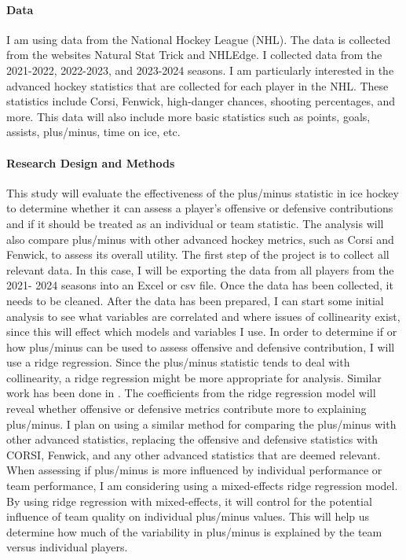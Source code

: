 \documentclass[12pt]{article}
\begin{document}
\paragraph{Data}

I am using data from the National Hockey League (NHL). The data is collected from the websites Natural Stat Trick and NHLEdge. 
I collected data from the 2021-2022, 2022-2023, and 2023-2024 seasons. I am particularly interested in the advanced hockey 
statistics that are collected for each player in the NHL. These statistics include Corsi, Fenwick, high-danger chances,
shooting percentages, and more. This data will also include more basic statistics such as points, goals, assists, plus/minus,
time on ice, etc.



\paragraph{Research Design and Methods}
This study will evaluate the effectiveness of the plus/minus statistic in ice hockey to determine whether it can assess a 
player's offensive or defensive contributions and if it should be treated as an individual or team statistic. The analysis 
will also compare plus/minus with other advanced hockey metrics, such as Corsi and Fenwick, to assess its overall utility.
The first step of the project is to collect all relevant data. In this case, I will be exporting the data from all players
from the 2021- 2024 seasons into an Excel or csv file. Once the data has been collected, it needs to be cleaned. After the
data has been prepared, I can start some initial analysis to see what variables are correlated and where issues of collinearity 
exist, since this will effect which models and variables I use. 
In order to determine if or how plus/minus can be used to assess offensive and defensive contribution, I will use a ridge 
regression. Since the plus/minus statistic tends to deal with collinearity, a ridge regression might be more appropriate for 
analysis. Similar work has been done in \cite{Macdonald_2012}. The coefficients from the ridge regression model will reveal 
whether offensive or defensive metrics contribute more to explaining plus/minus. I plan on using a similar method for comparing
the plus/minus with other advanced statistics, replacing the offensive and defensive statistics with CORSI, Fenwick, and any other
advanced statistics that are deemed relevant. When assessing if plus/minus is more influenced by individual performance or team 
performance, I am considering using a mixed-effects ridge regression model. By using ridge regression with mixed-effects, it will 
control for the potential influence of team quality on individual plus/minus values. This will help us determine how much of the 
variability in plus/minus is explained by the team versus individual players.
\end{document}
